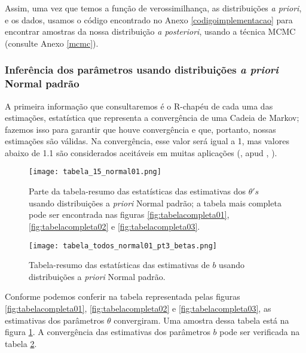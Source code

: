 \documentclass[
	12pt,				%
	openright,			%
	twoside,			%
	a4paper,			%
	english,			%
	brazil				%
	]{abntex2}
\begin{document}
 Assim, uma vez que temos a função de verossimilhança, as distribuições \emph{a priori}, e os dados, usamos o código encontrado no Anexo \ref{codigoimplementacao} para encontrar amostras da nossa distribuição \emph{a posteriori}, usando a técnica MCMC (consulte Anexo \ref{mcmc}).

 \subsubsection*{Inferência dos parâmetros usando distribuições \emph{a priori} Normal padrão}\label{normalpadraoinf}
 A primeira informação que consultaremos é o R-chapéu de cada uma das estimações, estatística que representa a convergência de uma Cadeia de Markov; fazemos isso para garantir que houve convergência e que, portanto, nossas estimações são válidas. Na convergência, esse valor será igual a 1, mas valores abaixo de 1.1 são considerados aceitáveis em muitas aplicações (, \citeyear{gelman2006} apud , \citeyear{terechshenko2017}).
 
 \begin{figure}[!htbp]
    \centering
    \texttt{[image: tabela\_15\_normal01.png]}
    \caption{Parte da tabela-resumo das estatísticas das estimativas dos $\theta's$ usando distribuições a \textit{priori} Normal padrão; a tabela mais completa pode ser encontrada nas figuras \ref{fig:tabelacompleta01}, \ref{fig:tabelacompleta02} e \ref{fig:tabelacompleta03}.}
    \label{fig:tabela01}
 \end{figure}
 
 \begin{figure}[!htbp]
    \centering
    \texttt{[image: tabela\_todos\_normal01\_pt3\_betas.png]}
    \caption{Tabela-resumo das estatísticas das estimativas de $b$ usando distribuições a \textit{priori} Normal padrão.}
    \label{fig:tabela01beta}
 \end{figure}
 
 Conforme podemos conferir na tabela representada pelas figuras \ref{fig:tabelacompleta01}, \ref{fig:tabelacompleta02} e \ref{fig:tabelacompleta03}, as estimativas dos parâmetros $\theta$ convergiram. Uma amostra dessa tabela está na figura \ref{fig:tabela01}. A convergência das estimativas dos parâmetros $b$ pode ser verificada na tabela \ref{fig:tabela01beta}. 
 
\end{document}
